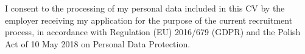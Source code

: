 \par\vspace{4pt}
\begingroup
\fontsize{9}{11}\selectfont\color{cvmuted}
I consent to the processing of my personal data included in this CV by the
employer receiving my application for the purpose of the current recruitment
process, in accordance with Regulation (EU) 2016/679 (GDPR) and the Polish Act
of 10 May 2018 on Personal Data Protection.\par
\endgroup
